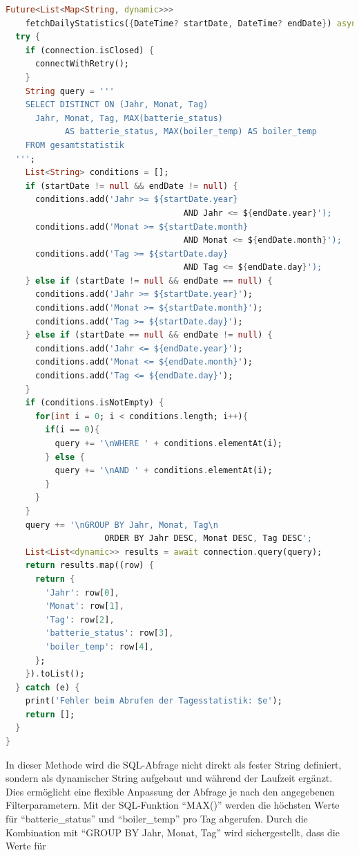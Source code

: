 \documentclass[11pt]{scrartcl}
\begin{document}
    \begin{lstlisting}[language=Dart]
Future<List<Map<String, dynamic>>>
    fetchDailyStatistics({DateTime? startDate, DateTime? endDate}) async {
  try {
    if (connection.isClosed) {
      connectWithRetry();
    }
    String query = '''
    SELECT DISTINCT ON (Jahr, Monat, Tag)
      Jahr, Monat, Tag, MAX(batterie_status)
            AS batterie_status, MAX(boiler_temp) AS boiler_temp
    FROM gesamtstatistik
  ''';
    List<String> conditions = [];
    if (startDate != null && endDate != null) {
      conditions.add('Jahr >= ${startDate.year}
                                    AND Jahr <= ${endDate.year}');
      conditions.add('Monat >= ${startDate.month}
                                    AND Monat <= ${endDate.month}');
      conditions.add('Tag >= ${startDate.day}
                                    AND Tag <= ${endDate.day}');
    } else if (startDate != null && endDate == null) {
      conditions.add('Jahr >= ${startDate.year}');
      conditions.add('Monat >= ${startDate.month}');
      conditions.add('Tag >= ${startDate.day}');
    } else if (startDate == null && endDate != null) {
      conditions.add('Jahr <= ${endDate.year}');
      conditions.add('Monat <= ${endDate.month}');
      conditions.add('Tag <= ${endDate.day}');
    }
    if (conditions.isNotEmpty) {
      for(int i = 0; i < conditions.length; i++){
        if(i == 0){
          query += '\nWHERE ' + conditions.elementAt(i);
        } else {
          query += '\nAND ' + conditions.elementAt(i);
        }
      }
    }
    query += '\nGROUP BY Jahr, Monat, Tag\n
                    ORDER BY Jahr DESC, Monat DESC, Tag DESC';
    List<List<dynamic>> results = await connection.query(query);
    return results.map((row) {
      return {
        'Jahr': row[0],
        'Monat': row[1],
        'Tag': row[2],
        'batterie_status': row[3],
        'boiler_temp': row[4],
      };
    }).toList();
  } catch (e) {
    print('Fehler beim Abrufen der Tagesstatistik: $e');
    return [];
  }
}
    \end{lstlisting}
    In dieser Methode wird die SQL-Abfrage nicht direkt als fester String definiert, sondern als
    dynamischer String aufgebaut und während der Laufzeit ergänzt.
    Dies ermöglicht eine flexible Anpassung der Abfrage je nach den angegebenen Filterparametern.
    Mit der SQL-Funktion \enquote{MAX()} werden die höchsten Werte für \enquote{batterie\_status} und
    \enquote{boiler\_temp} pro Tag abgerufen.
    Durch die Kombination mit \enquote{GROUP BY Jahr, Monat, Tag} wird sichergestellt, dass die Werte für
\end{document}
